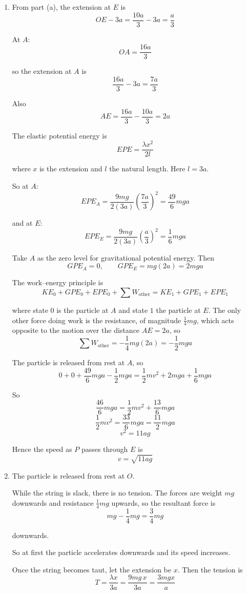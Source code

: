 \documentclass[leqno]{article}
\begin{document}
\begin{enumerate}[
  label=\textbf{\arabic*.},
  leftmargin=*,
  topsep=0pt,
  partopsep=0pt,
  parsep=0pt
]
\begin{djsSolution}
\begin{enumerate}[label=\textbf{(\alph*)}, start=1]
Hence the length of the string is
\[
OE=3a+\frac{a}{3}=\frac{10a}{3}
\]


  \item From part (a), the extension at \(E\) is
\[
OE-3a=\frac{10a}{3}-3a=\frac{a}{3}
\]

At \(A\):
\[
OA=\frac{16a}{3}
\]

so the extension at \(A\) is
\[
\frac{16a}{3}-3a=\frac{7a}{3}
\]

Also
\[
AE=\frac{16a}{3}-\frac{10a}{3}=2a
\]

The elastic potential energy is
\[
EPE=\frac{\lambda x^2}{2l}
\]

where \(x\) is the extension and \(l\) the natural length. Here \(l=3a\).

So at \(A\):
\[
EPE_A=\frac{9mg}{2(3a)}\left(\frac{7a}{3}\right)^2=\frac{49}{6}mga
\]

and at \(E\):
\[
EPE_E=\frac{9mg}{2(3a)}\left(\frac{a}{3}\right)^2=\frac{1}{6}mga
\]

Take \(A\) as the zero level for gravitational potential energy. Then
\[
GPE_A=0,
\qquad
GPE_E=mg(2a)=2mga
\]

The work--energy principle is
\[
KE_0+GPE_0+EPE_0+\sum W_{\text{other}}=KE_1+GPE_1+EPE_1
\]

where state \(0\) is the particle at \(A\) and state \(1\) the particle at \(E\). The only other force doing work is the resistance, of magnitude \(\frac14 mg\), which acts opposite to the motion over the distance \(AE=2a\), so
\[
\sum W_{\text{other}}=-\frac14 mg(2a)=-\frac12 mga
\]

The particle is released from rest at \(A\), so
\[
0+0+\frac{49}{6}mga-\frac12 mga=\frac12 mv^2+2mga+\frac16 mga
\]

So
\[
\frac{46}{6}mga=\frac12 mv^2+\frac{13}{6}mga
\]
\[
\frac12 mv^2=\frac{33}{6}mga=\frac{11}{2}mga
\]
\[
v^2=11ag
\]

Hence the speed as \(P\) passes through \(E\) is
\[
v=\sqrt{11ag}
\]

  \item The particle is released from rest at \(O\).

While the string is slack, there is no tension. The forces are weight \(mg\) downwards and resistance \(\frac14 mg\) upwards, so the resultant force is
\[
mg-\frac14 mg=\frac34 mg
\]

downwards.

So at first the particle accelerates downwards and its speed increases.

Once the string becomes taut, let the extension be \(x\). Then the tension is
\[
T=\frac{\lambda x}{3a}=\frac{9mg\,x}{3a}=\frac{3mgx}{a}
\]


\end{enumerate}
\end{djsSolution}
\end{enumerate}
\end{document}
